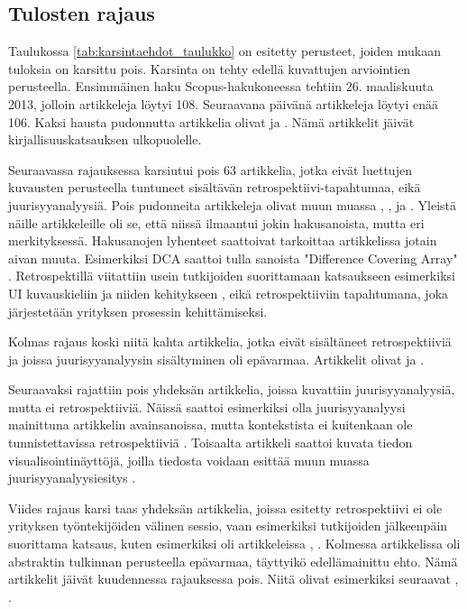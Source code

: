 \subsection{Tulosten rajaus}
Taulukossa \ref{tab:karsintaehdot_taulukko} on esitetty perusteet, joiden mukaan tuloksia on karsittu pois. Karsinta on tehty edellä kuvattujen arviointien perusteella. Ensimmäinen haku Scopus-hakukoneessa tehtiin 26. maaliskuuta 2013, jolloin artikkeleja löytyi 108. Seuraavana päivänä artikkeleja löytyi enää 106. Kaksi hausta pudonnutta artikkelia olivat \citep{bolosky2007farsite} ja \citep{dreiseitl2005nomographic}. Nämä artikkelit jäivät kirjallisuuskatsauksen ulkopuolelle.

Seuraavassa rajauksessa karsiutui pois 63 artikkelia, jotka eivät luettujen kuvausten perusteella tuntuneet sisältävän retrospektiivi-tapahtumaa, eikä juurisyyanalyysiä. Pois pudonneita artikkeleja olivat muun muassa \citep{yang2012personalized}, \citep{ji2010constructions}, \citep{helms2008retrospective} ja \citep{richardson2006developing}. Yleistä näille artikkeleille oli se, että niissä ilmaantui jokin hakusanoista, mutta eri merkityksessä. Hakusanojen lyhenteet saattoivat tarkoittaa artikkelissa jotain aivan muuta. Esimerkiksi DCA saattoi tulla sanoista "Difference Covering Array" \citep{ji2010constructions}. Retrospektillä viitattiin usein tutkijoiden suorittamaan katsaukseen esimerkiksi UI kuvauskieliin ja niiden kehitykseen \citep{helms2008retrospective}, eikä retrospektiiviin tapahtumana, joka järjestetään yrityksen prosessin kehittämiseksi.

Kolmas rajaus koski niitä kahta artikkelia, jotka eivät sisältäneet retrospektiiviä ja joissa juurisyyanalyysin sisältyminen oli epävarmaa. Artikkelit olivat \citep{anquetil2007software} ja \citep{wang2004strider}.

Seuraavaksi rajattiin pois yhdeksän artikkelia, joissa kuvattiin juurisyyanalyysiä, mutta ei retrospektiiviä. Näissä saattoi esimerkiksi olla juurisyyanalyysi mainittuna artikkelin avainsanoissa, mutta kontekstista ei kuitenkaan ole tunnistettavissa retrospektiiviä \citep{yu1998software}. Toisaalta artikkeli saattoi kuvata tiedon visualisointinäyttöjä, joilla tiedosta voidaan esittää muun muassa juurisyyanalyysiesitys \citep{hao2008density}.

Viides rajaus karsi taas yhdeksän artikkelia, joissa esitetty retrospektiivi ei ole yrityksen työntekijöiden välinen sessio, vaan esimerkiksi tutkijoiden jälkeenpäin suorittama katsaus, kuten esimerkiksi oli artikkeleissa \citep{wolforth2010generalizable}, \citep{ardimento2004multiview}. Kolmessa artikkelissa oli abstraktin tulkinnan perusteella epävarmaa, täyttyikö edellämainittu ehto. Nämä artikkelit jäivät kuudennessa rajauksessa pois. Niitä olivat esimerkiksi seuraavat \citep{xu2012enabling}, \citep{grady1996software}. 

